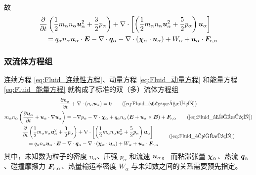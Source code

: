故
\begin{equation}\begin{aligned}\label{eq:Fluid_能量方程}
& \frac{\partial {}}{\partial {t}} \left(
    \frac{1}{2} m_\alpha n_\alpha \bm{u}_\alpha^2 + \frac{3}{2} p_\alpha
\right)
+ \nabla \cdot {\left[
    \left(\frac{1}{2} m_\alpha n_\alpha \bm{u}_\alpha^2
    + \frac{5}{2} p_\alpha \right) \bm{u}_\alpha
\right]} \\
& \quad = q_\alpha n_\alpha \bm{u}_\alpha \cdot \bm{E}
- \nabla \cdot {\bm{q}_\alpha}
- \nabla \cdot {(\bm{\chi}_\alpha \cdot \bm{u}_\alpha)}
+ W_\alpha + \bm{u}_\alpha \cdot \bm{F}_{r,\alpha}
\end{aligned}\end{equation}

\subsubsection{双流体方程组}

连续方程 \ref{eq:Fluid_连续性方程}、动量方程 \ref{eq:Fluid_动量方程} 和能量方程 \ref{eq:Fluid_能量方程} 就构成了标准的双（多）流体方程组
\begin{gather}
\pDeriv{n_\alpha}{t} + \dive{(n_\alpha \vector{u}_\alpha)} = 0
\tag{\ref{eq:Fluid_连续性方程}} \\
m_\alpha n_\alpha \left(
    \pDeriv{\vector{u}_\alpha}{t} + \vector{u}_\alpha \cdot \grad{\vector{u}_\alpha}
\right)
= - \grad{p_\alpha} - \dive{\vector{\chi}_\alpha} + q_\alpha n_\alpha \left( \vector{E} + \vector{u}_\alpha \times \vector{B} \right) + \vector{F}_{r,\alpha}
\tag{\ref{eq:Fluid_动量方程}} \\
\begin{aligned}
& \pDeriv{}{t} \left(
    \frac{1}{2} m_\alpha n_\alpha \vector{u}_\alpha^2 + \frac{3}{2} p_\alpha
\right)
+ \dive{\left[
    \left(\frac{1}{2} m_\alpha n_\alpha \vector{u}_\alpha^2
    + \frac{5}{2} p_\alpha \right) \vector{u}_\alpha
\right]} \\
& \quad = q_\alpha n_\alpha \vector{u}_\alpha \cdot \vector{E}
- \dive{\vector{q}_\alpha}
- \dive{(\vector{\chi}_\alpha \cdot \vector{u}_\alpha)}
+ W_\alpha + \vector{u}_\alpha \cdot \vector{F}_{r,\alpha}
\end{aligned}
\tag{\ref{eq:Fluid_能量方程}}
\end{gather}
其中，未知数为粒子的密度 $n_\alpha$、压强 $p_\alpha$ 和流速 $\bm{u}_\alpha$。
而粘滞张量 $\bm{\chi}_\alpha$、热流 $\bm{q}_\alpha$、碰撞摩擦力 $\bm{F}_{r,\alpha}$、热量输运率密度 $W_\alpha$ 与未知数之间的关系需要预先指定。

